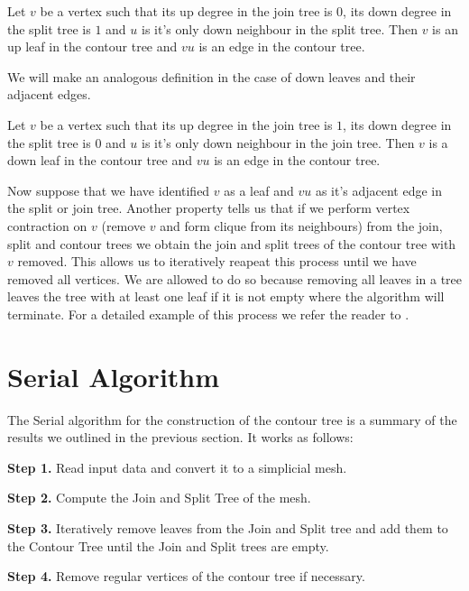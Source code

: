 \begin{defn} Let $v$ be a vertex such that its up degree in the join tree is $0$, its down degree in the split tree is $1$ and $u$ is it's only down neighbour in the split tree. Then $v$ is an up leaf in the contour tree and $vu$ is an edge in the contour tree.  \end{defn}

We will make an analogous definition in the case of down leaves and their adjacent edges.

\begin{defn} Let $v$ be a vertex such that its up degree in the join tree is $1$, its down degree in the split tree is $0$ and $u$ is it's only down neighbour in the join tree. Then $v$ is a down leaf in the contour tree and $vu$ is an edge in the contour tree.  \end{defn}


Now suppose that we have identified $v$ as a leaf and $vu$ as it's adjacent edge in the split or join tree. Another property \cite{carr-masters} tells us that if we perform vertex contraction on $v$ (remove $v$ and form clique from its neighbours) from the join, split and contour trees we obtain the join and split trees of the contour tree with $v$ removed. This allows us to iteratively reapeat this process until we have removed all vertices. We are allowed to do so because removing all leaves in a tree leaves the tree with at least one leaf if it is not empty where the algorithm will terminate. For a detailed example of this process we refer the reader to \cite{ct-big-paper}.

\section{Serial Algorithm}

The Serial algorithm for the construction of the contour tree is a summary of the results we outlined in the previous section. It works as follows:

\textbf{Step 1.} Read input data and convert it to a simplicial mesh.

\textbf{Step 2.} Compute the Join and Split Tree of the mesh.

\textbf{Step 3.} Iteratively remove leaves from the Join and Split tree and add them to the Contour Tree until the Join and Split trees are empty.

\textbf{Step 4.} Remove regular vertices of the contour tree if necessary.

